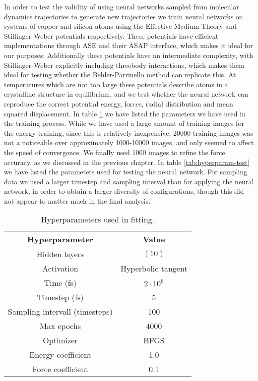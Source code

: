 In order to test the validity of using neural networks sampled
from molecular dynamics trajectories to generate new trajectories
we train neural networks on systems of copper and silicon atoms
using the Effective Medium Theory and Stillinger-Weber potentials
respectively. These potentials have efficient implementations
through ASE and their ASAP interface, which makes
it ideal for our purposes. Additionally these potentials
have an intermediate complexity, with Stillinger-Weber explicitly
including threebody interactions, which makes them ideal
for testing whether the Behler-Parrinello method can replicate this.
At temperatures which are not too large these potentials describe
atoms in a crystalline structure in equilibrium,
and we test whether the neural network can reproduce the correct potential
energy, forces, radial distribution and mean squared displacement.
In table \ref{tab:hyperparam} we have listed the parameters we have
used in the training process. While we have used a large amount
of training images for the energy training, since this is relatively
inexpensive, 20000 training images was not a noticeable over approximately
1000-10000 images, and only seemed to affect the speed of convergence.
We finally used 1000 images to refine the force accuracy,
as we discussed in the previous chapter.
In table \ref{tab:hyperparam-test} we have listed the parameters
used for testing the neural network. For sampling data we used a larger
timestep and sampling interval
than for applying the neural network, in order to obtain
a larger diversity of configurations, though this did not appear to
matter much in the final analysis.


\begin{table}[H]
\centering
\begin{tabular}{|c c|}
\hline
Hyperparameter & Value \\
\hline \hline
    Hidden layers & $(10)$ \\
Activation & Hyperbolic tangent \\
    Time (fs) & $2 \cdot 10^6$ \\
    Timestep (fs) & 5 \\
    Sampling intervall (timesteps) & 100 \\
Max epochs & 4000 \\
Optimizer & BFGS \\
Energy coefficient & 1.0 \\
Force coefficient & 0.1 \\
\hline
\end{tabular}
\caption{Hyperparameters used in fitting.}
\label{tab:hyperparam}
\end{table}

